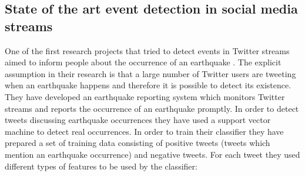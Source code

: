 \subsection{State of the art event detection in social media streams}\label{sec:StateoftheArt}
One of the first research projects that tried to detect events in Twitter streams aimed to inform people about the occurrence of an earthquake \cite{Sakaki:2010:EST:1772690.1772777}. The explicit assumption in their research is that a large number of Twitter users are tweeting when an earthquake happens and therefore it is possible to detect its existence. They have developed an earthquake reporting system which monitors Twitter streams and reports the occurrence of an earthquake promptly.  In order to detect tweets discussing earthquake occurrences they have used a support vector machine to detect real occurrences. In order to train their classifier they have prepared a set of training data consisting of positive tweets (tweets which mention an earthquake occurrence) and negative tweets. For each tweet they used different types of features to be used by the classifier:
	 
